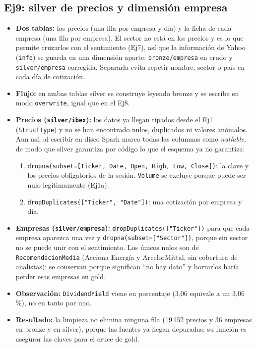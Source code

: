 \documentclass[11pt,a4paper]{article}
\newcommand{\code}[1]{\texttt{#1}}
\begin{document}
\subsection*{Ej9: silver de precios y dimensión empresa}
\begin{itemize}
    \item \textbf{Dos tablas:} los precios (una fila por empresa y día) y la ficha de cada empresa (una fila por empresa). El sector no está en los precios y es lo que permite cruzarlos con el sentimiento (Ej7), así que la información de Yahoo (\code{info}) se guarda en una dimensión aparte: \code{bronze/empresa} en crudo y \code{silver/empresa} corregida. Separarla evita repetir nombre, sector o país en cada día de cotización.
    \item \textbf{Flujo:} en ambas tablas silver se construye leyendo bronze y se escribe en modo \code{overwrite}, igual que en el Ej8.
    \item \textbf{Precios (\code{silver/ibex}):} los datos ya llegan tipados desde el Ej1 (\code{StructType}) y no se han encontrado nulos, duplicados ni valores anómalos. Aun así, al escribir en disco Spark marca todas las columnas como \textit{nullable}, de modo que silver garantiza por código lo que el esquema ya no garantiza:
    \begin{enumerate}
        \item \code{dropna(subset=[Ticker, Date, Open, High, Low, Close])}: la clave y los precios obligatorios de la sesión. \code{Volume} se excluye porque puede ser nulo legítimamente (Ej1a).
        \item \code{dropDuplicates(["Ticker", "Date"])}: una cotización por empresa y día.
    \end{enumerate}
    \item \textbf{Empresas (\code{silver/empresa}):} \code{dropDuplicates(["Ticker"])} para que cada empresa aparezca una vez y \code{dropna(subset=["Sector"])}, porque sin sector no se puede unir con el sentimiento. Los únicos nulos son de \code{RecomendacionMedia} (Acciona Energía y ArcelorMittal, sin cobertura de analistas): se conservan porque significan ``no hay dato'' y borrarlos haría perder esas empresas en gold.
    \item \textbf{Observación:} \code{DividendYield} viene en porcentaje (3{,}06 equivale a un 3{,}06\,\%), no en tanto por uno.
    \item \textbf{Resultado:} la limpieza no elimina ninguna fila (19\,152 precios y 36 empresas en bronze y en silver), porque las fuentes ya llegan depuradas; su función es asegurar las claves para el cruce de gold.
\end{itemize}
\end{document}
